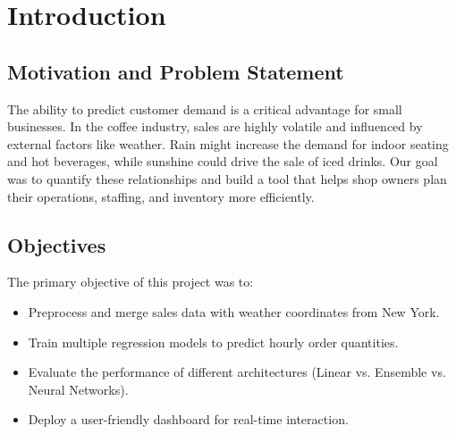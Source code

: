 \chapter{Introduction}
\label{sec:intro}

\section{Motivation and Problem Statement}
The ability to predict customer demand is a critical advantage for small businesses. In the coffee industry, sales are highly volatile and influenced by external factors like weather. Rain might increase the demand for indoor seating and hot beverages, while sunshine could drive the sale of iced drinks. Our goal was to quantify these relationships and build a tool that helps shop owners plan their operations, staffing, and inventory more efficiently.

\section{Objectives}
The primary objective of this project was to:
\begin{itemize}
    \item Preprocess and merge sales data with weather coordinates from New York.
    \item Train multiple regression models to predict hourly order quantities.
    \item Evaluate the performance of different architectures (Linear vs. Ensemble vs. Neural Networks).
    \item Deploy a user-friendly dashboard for real-time interaction.
\end{itemize}